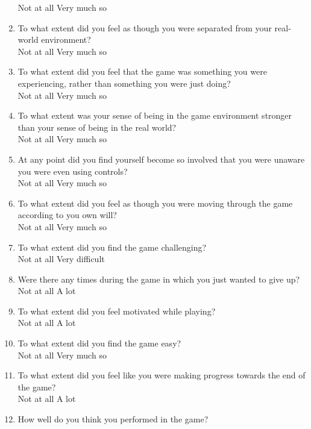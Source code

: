 \documentclass[../II2202-proposal.tex]{subfiles}
\begin{document}
\begin{enumerate}
    Not at all      \quad Very much so
    \item To what extent did you feel as though you were separated from your real-world environment? \\
    Not at all      \quad Very much so
    \item To what extent did you feel that the game was something you were experiencing, rather than something you were just doing? \\
    Not at all      \quad Very much so
    \item To what extent was your sense of being in the game environment stronger than your sense of being in the real world? \\
    Not at all      \quad Very much so
    \item At any point did you find yourself become so involved that you were unaware you were even using controls? \\
    Not at all      \quad Very much so
    \item To what extent did you feel as though you were moving through the game according to you own will? \\
    Not at all      \quad Very much so
    \item To what extent did you find the game challenging?  \\
    Not at all      \quad Very difficult
    \item Were there any times during the game in which you just wanted to give up? \\
    Not at all      \quad A lot
    \item To what extent did you feel motivated while playing?  \\
    Not at all      \quad A lot
    \item To what extent did you find the game easy? \\
    Not at all      \quad Very much so
    \item To what extent did you feel like you were making progress towards the end of the game? \\
    Not at all      \quad A lot
    \item How well do you think you performed in the game?  \\

\end{enumerate}
\end{document}
